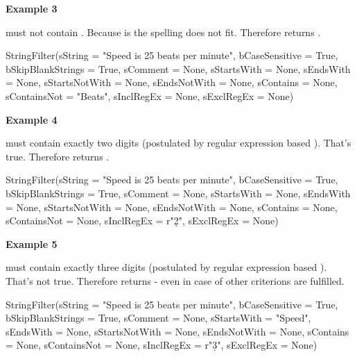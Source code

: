 \textbf{Example 3}

 must not contain . Because  is  the spelling does not fit.
Therefore  returns .

\begin{pythoncode}
StringFilter(sString           = "Speed is 25 beats per minute",
             bCaseSensitive    = True,
             bSkipBlankStrings = True,
             sComment          = None,
             sStartsWith       = None,
             sEndsWith         = None,
             sStartsNotWith    = None,
             sEndsNotWith      = None,
             sContains         = None,
             sContainsNot      = "Beats",
             sInclRegEx        = None,
             sExclRegEx        = None)
\end{pythoncode}

\newpage

\textbf{Example 4}

 must contain exactly two digits (postulated by regular expression based ).
That's true. Therefore  returns .

\begin{pythoncode}
StringFilter(sString           = "Speed is 25 beats per minute",
             bCaseSensitive    = True,
             bSkipBlankStrings = True,
             sComment          = None,
             sStartsWith       = None,
             sEndsWith         = None,
             sStartsNotWith    = None,
             sEndsNotWith      = None,
             sContains         = None,
             sContainsNot      = None,
             sInclRegEx        = r"\d{2}",
             sExclRegEx        = None)
\end{pythoncode}

\textbf{Example 5}

 must contain exactly three digits (postulated by regular expression based ).
That's not true. Therefore  returns  - even in case of other criterions are fulfilled.

\begin{pythoncode}
StringFilter(sString           = "Speed is 25 beats per minute",
             bCaseSensitive    = True,
             bSkipBlankStrings = True,
             sComment          = None,
             sStartsWith       = "Speed",
             sEndsWith         = None,
             sStartsNotWith    = None,
             sEndsNotWith      = None,
             sContains         = None,
             sContainsNot      = None,
             sInclRegEx        = r"\d{3}",
             sExclRegEx        = None)
\end{pythoncode}

